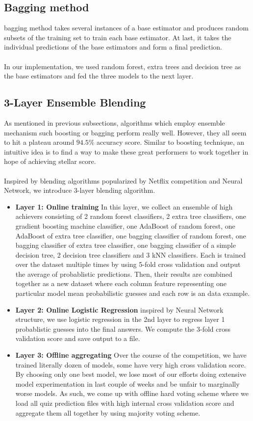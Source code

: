 \documentclass[conference]{IEEEtran}
\begin{document}
\subsection{Bagging method}
bagging method takes several instances of a base estimator and produces random subsets of the training set to train each base estimator. At last, it takes the individual predictions of the base estimators and form a final prediction. \\ \\
In our implementation, we used random forest, extra trees and decision tree as the base estimators and fed the three models to the next layer.  

\subsection{3-Layer Ensemble Blending}
As mentioned in previous subsections, algorithms which employ ensemble mechanism such boosting or bagging perform really well. However, they all seem to hit a plateau around $94.5\%$ accuracy score. Similar to boosting technique, an intuitive idea is to find a way to make these great performers to work together in hope of achieving stellar score. \\ \\
Inspired by blending algorithms popularized by Netflix competition and Neural Network, we introduce 3-layer blending algorithm.
\\
\begin{itemize}
\item \textbf{Layer 1: Online training} In this layer, we collect an ensemble of high achievers consisting of 2 random forest classifiers, 2 extra tree classifiers, one gradient boosting machine classifier, one AdaBoost of random forest, one AdaBoost of extra tree classifier, one bagging classifier of random forest, one bagging classifier of extra tree classifier, one bagging classifier of a simple decision tree, 2 decision tree classifiers and 3 kNN classifiers. Each is trained over the dataset multiple times by using 5-fold cross validation and output the average of probablistic predictions. Then, their results are combined together as a new dataset where each column feature representing one particular model mean probabilistic guesses and each row is an data example.
\item \textbf{Layer 2: Online Logistic Regression} inspired by Neural Network structure, we use logistic regression in the 2nd layer to regress layer 1 probablistic guesses into the final answers. We compute the 3-fold cross validation score and save output to a file.
\item \textbf{Layer 3: Offline aggregating} Over the course of the competition, we have trained literally dozen of models, some have very high cross validation score. By choosing only one best model, we lose most of our efforts doing extensive model experimentation in last couple of weeks and be unfair to marginally worse models. As such, we come up with offline hard voting scheme where we load all quiz prediction files with high internal cross validation score and aggregate them all together by using majority voting scheme.
\end{itemize}
\end{document}
